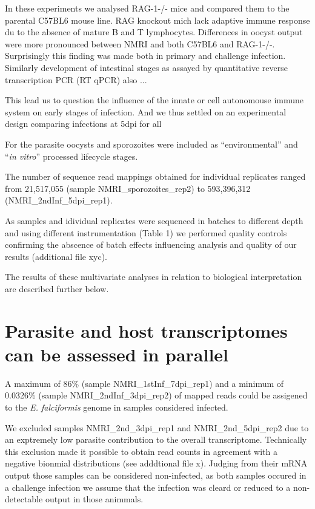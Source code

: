 \documentclass{bmcart}
\begin{document}
In these experiments we analysed RAG-1-/- mice and compared them to
the parental C57BL6 mouse line. RAG knockout mich lack adaptive immune
response du to the absence of mature B and T lymphocytes. Differences
in oocyst output were more pronounced between NMRI and both C57BL6 and
RAG-1-/-. Surprisingly this finding was made both in primary and
challenge infection. Similarly development of intestinal stages as
assayed by quantitative reverse transcription PCR (RT qPCR) also ...

This lead us to question the influence of the innate or cell
autonomouse immune system on early stages of infection. And we thus
settled on an experimental design comparing infections at 5dpi for all

For the parasite oocysts and sporozoites were included as
``environmental'' and ``\textit{in vitro}'' processed lifecycle
stages.

The number of sequence read mappings obtained for individual
replicates ranged from 21,517,055 (sample NMRI\_sporozoites\_rep2) to
593,396,312 (NMRI\_2ndInf\_5dpi\_rep1).

As samples and idividual replicates were sequenced in batches to
different depth and using different instrumentation (Table 1) we
performed quality controls confirming the abscence of batch effects
influencing analysis and quality of our results (additional file xyc).

The results of these multivariate analyses in relation to biological
interpretation are described further below. 

\section*{Parasite and host transcriptomes can be assessed in parallel}

A maximum of 86\% (sample NMRI\_1stInf\_7dpi\_rep1) and a minimum of
0.0326\% (sample NMRI\_2ndInf\_3dpi\_rep2) of mapped reads could be
assigened to the \textit{E. falciformis} genome in samples considered
infected.

We excluded samples NMRI\_2nd\_3dpi\_rep1 and NMRI\_2nd\_5dpi\_rep2
due to an exptremely low parasite contribution to the overall
transcriptome. Technically this exclusion made it possible to obtain
read counts in agreement with a negative bionmial distributions (see
adddtional file x). Judging from their mRNA output those samples can
be considered non-infected, as both samples occured in a challenge
infection we assume that the infection was cleard or reduced to a
non-detectable output in those animmals.
\end{document}
